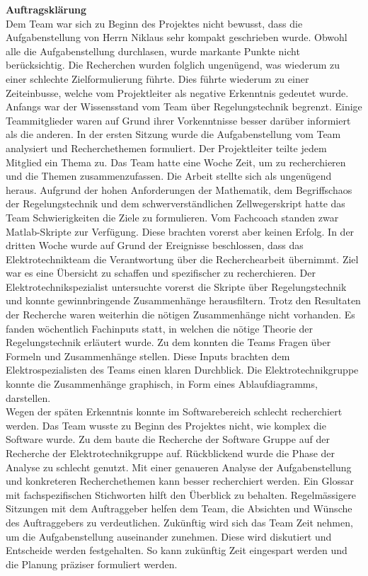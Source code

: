 \textbf{Auftragsklärung}\\
Dem Team war sich zu Beginn des Projektes nicht bewusst, dass die Aufgabenstellung von Herrn Niklaus sehr kompakt geschrieben wurde. Obwohl alle die Aufgabenstellung durchlasen, wurde markante Punkte nicht berücksichtig. Die Recherchen wurden folglich ungenügend, was wiederum zu einer schlechte Zielformulierung führte. Dies führte wiederum zu einer Zeiteinbusse, welche vom Projektleiter als negative Erkenntnis gedeutet wurde.\\ 
Anfangs war der Wissensstand vom Team über Regelungstechnik begrenzt. Einige Teammitglieder waren auf Grund ihrer Vorkenntnisse besser darüber informiert als die anderen. In der ersten Sitzung wurde die Aufgabenstellung vom Team analysiert und Recherchethemen formuliert. Der Projektleiter teilte jedem Mitglied ein Thema zu. Das Team hatte eine Woche Zeit, um zu recherchieren und die Themen zusammenzufassen. Die Arbeit stellte sich als ungenügend heraus. Aufgrund der hohen Anforderungen der Mathematik, dem Begriffschaos der Regelungstechnik und dem schwerverständlichen Zellwegerskript hatte das Team Schwierigkeiten die Ziele zu formulieren. Vom Fachcoach standen zwar Matlab-Skripte zur Verfügung. Diese brachten vorerst aber keinen Erfolg. In der dritten Woche wurde auf Grund der Ereignisse beschlossen, dass das Elektrotechnikteam die Verantwortung über die Recherchearbeit übernimmt. Ziel war es eine Übersicht zu schaffen und spezifischer zu recherchieren. Der Elektrotechnikspezialist untersuchte vorerst die Skripte über Regelungstechnik und konnte gewinnbringende Zusammenhänge herausfiltern. Trotz den Resultaten der Recherche waren weiterhin die nötigen Zusammenhänge nicht vorhanden. Es fanden wöchentlich Fachinputs statt, in welchen die nötige Theorie der Regelungstechnik erläutert wurde. Zu dem konnten die Teams Fragen über Formeln und Zusammenhänge stellen. Diese Inputs brachten dem Elektrospezialisten des Teams einen klaren Durchblick. Die Elektrotechnikgruppe konnte die Zusammenhänge graphisch, in Form eines Ablaufdiagramms, darstellen.\\
Wegen der späten Erkenntnis konnte im Softwarebereich schlecht recherchiert werden. Das Team wusste zu Beginn des Projektes nicht, wie komplex die Software wurde. Zu dem baute die Recherche der Software Gruppe auf der Recherche der Elektrotechnikgruppe auf. 
Rückblickend wurde die Phase der Analyse zu schlecht genutzt. Mit einer genaueren Analyse der Aufgabenstellung und konkreteren Recherchethemen kann besser recherchiert werden. Ein Glossar mit fachspezifischen Stichworten hilft den Überblick zu behalten. Regelmässigere Sitzungen mit dem Auftraggeber helfen dem Team, die Absichten und Wünsche des Auftraggebers zu verdeutlichen.
Zukünftig wird sich das Team Zeit nehmen, um die Aufgabenstellung auseinander zunehmen. Diese wird diskutiert und Entscheide werden festgehalten. So kann zukünftig Zeit eingespart werden und die Planung präziser formuliert werden.
